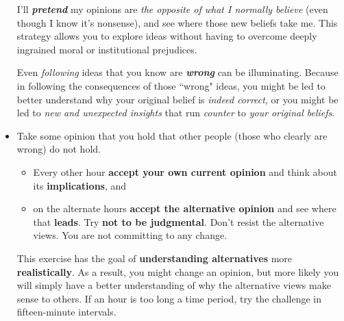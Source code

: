 \documentclass[11pt]{article}
\begin{document}
\begin{itemize}
I’ll \emph{\textbf{pretend}} my opinions are \emph{the opposite of what I normally believe} (even though I know it’s nonsense), and see where those new beliefs take me. This strategy allows you to explore ideas without having to overcome deeply ingrained moral
or institutional prejudices. 

Even \emph{following} ideas that you know are \emph{\textbf{wrong}} can be illuminating. Because in following the consequences of those ``wrong" ideas, you might be led to better understand why your original belief is \emph{indeed correct}, or you might be led to \emph{new and unexpected insights} that run \emph{counter} to \emph{your original beliefs}.

\item \begin{exercise}
Take some opinion that you hold that other people (those who clearly are wrong) do not hold. 
\begin{itemize}
\item Every other hour \textbf{accept your own current opinion} and think about its \textbf{implications}, and 

\item on the alternate hours \textbf{accept the alternative opinion} and see where that \textbf{leads}. Try \textbf{not to be judgmental}. Don’t resist the alternative views. You are not committing to any change. 
\end{itemize}
This exercise has the goal of \textbf{understanding alternatives} more \textbf{realistically}. As a result, you might change an opinion, but more likely you will simply have a better understanding of why the alternative views make sense to others. If an hour is too long a time period, try the challenge in fifteen-minute intervals.
\end{exercise}
\end{itemize}
\end{document}
